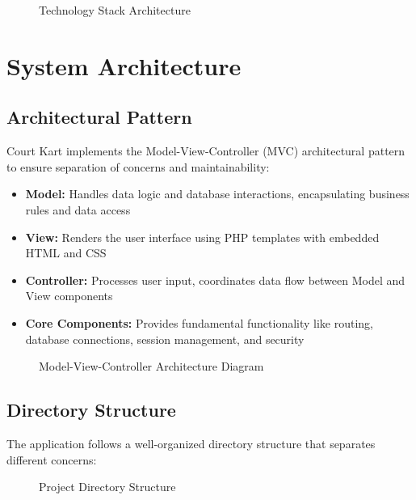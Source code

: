 \documentclass[14pt,a4paper]{article}
\begin{document}
\begin{figure}[H]
	\centering
	\caption{Technology Stack Architecture}
	\label{fig:tech-stack}
\end{figure}

\section{System Architecture}

\subsection{Architectural Pattern}
Court Kart implements the Model-View-Controller (MVC) architectural pattern to ensure separation of concerns and maintainability:

\begin{itemize}
	\item \textbf{Model:} Handles data logic and database interactions, encapsulating business rules and data access
	\item \textbf{View:} Renders the user interface using PHP templates with embedded HTML and CSS
	\item \textbf{Controller:} Processes user input, coordinates data flow between Model and View components
	\item \textbf{Core Components:} Provides fundamental functionality like routing, database connections, session management, and security
\end{itemize}

\begin{figure}[H]
	\centering
	\caption{Model-View-Controller Architecture Diagram}
	\label{fig:mvc}
\end{figure}

\subsection{Directory Structure}
The application follows a well-organized directory structure that separates different concerns:

\begin{figure}[H]
	\centering
	\caption{Project Directory Structure}
	\label{fig:directory}
\end{figure}
\end{document}

